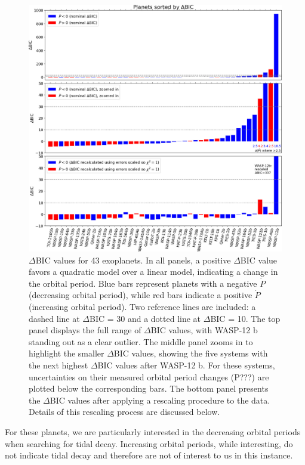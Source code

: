 \documentclass[oneside,12pt]{amsart}
\numberwithin{page}{section}
\begin{document}
\begin{figure}[htbp]
    \centering
    \includegraphics[width=0.9\linewidth]{figs/adams_fig2.jpg}
    \caption{$\Delta$BIC values for 43 exoplanets. In all panels, a positive $\Delta$BIC value favors a quadratic model over a linear model, indicating a change in the orbital period. Blue bars represent planets with a negative $\dot{P}$ (decreasing orbital period), while red bars indicate a positive $\dot{P}$ (increasing orbital period). Two reference lines are included: a dashed line at $\Delta$BIC = 30 and a dotted line at $\Delta$BIC = 10. 
    The top panel displays the full range of $\Delta$BIC values, with WASP-12 b standing out as a clear outlier. The middle panel zooms in to highlight the smaller $\Delta$BIC values, showing the five systems with the next highest $\Delta$BIC values after WASP-12 b. For these systems, uncertainties on their measured orbital period changes (P???) are plotted below the corresponding bars. The bottom panel presents the $\Delta$BIC values after applying a rescaling procedure to the data. Details of this rescaling process are discussed below.}
    \label{fig:adams-fig2}
\end{figure}

For these planets, we are particularly interested in the decreasing orbital periods when searching for tidal decay. Increasing orbital periods, while interesting, do not indicate tidal decay and therefore are not of interest to us in this instance. 
\end{document}
